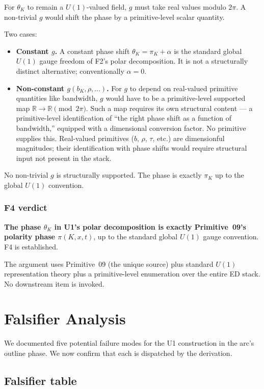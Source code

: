 \documentclass[11pt,a4paper]{article}
\begin{document}
For $\theta_K$ to remain a $U(1)$-valued field, $g$ must take real values modulo $2\pi$. A non-trivial $g$ would shift the phase by a primitive-level scalar quantity.

Two cases:
\begin{itemize}
  \item \textbf{Constant $g$.} A constant phase shift $\theta_K = \pi_K + \alpha$ is the standard global $U(1)$ gauge freedom of F2's polar decomposition. It is not a structurally distinct alternative; conventionally $\alpha = 0$.
  \item \textbf{Non-constant $g(b_K, \rho, \ldots)$.} For $g$ to depend on real-valued primitive quantities like bandwidth, $g$ would have to be a primitive-level supported map $\mathbb{R} \to \mathbb{R} \pmod{2\pi}$. Such a map requires its own structural content --- a primitive-level identification of ``the right phase shift as a function of bandwidth,'' equipped with a dimensional conversion factor. No primitive supplies this. Real-valued primitives ($b$, $\rho$, $\tau$, etc.) are dimensionful magnitudes; their identification with phase shifts would require structural input not present in the stack.
\end{itemize}

No non-trivial $g$ is structurally supported. The phase is exactly $\pi_K$ up to the global $U(1)$ convention.

\subsubsection{F4 verdict}

\textbf{The phase $\theta_K$ in U1's polar decomposition is exactly Primitive~09's polarity phase $\pi(K, x, t)$}, up to the standard global $U(1)$ gauge convention. F4 is established.

The argument uses Primitive~09 (the unique source) plus standard $U(1)$ representation theory plus a primitive-level enumeration over the entire ED stack. No downstream item is invoked.

\section{Falsifier Analysis}\label{sec:falsifiers}

We documented five potential failure modes for the U1 construction in the arc's outline phase. We now confirm that each is dispatched by the derivation.

\subsection{Falsifier table}
\end{document}
